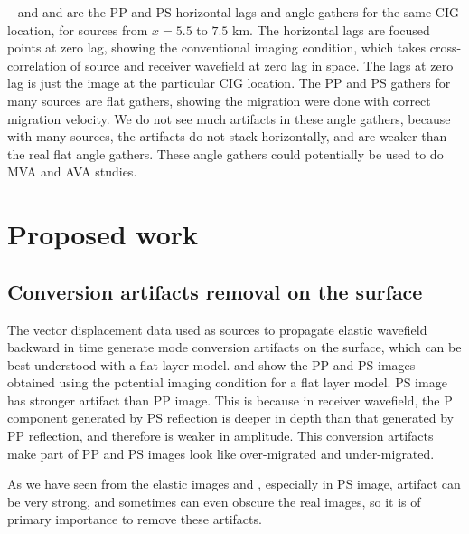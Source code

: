 -- and  and  are the PP and PS horizontal lags and angle gathers for the same CIG location, for sources from $x=5.5$ to $7.5$ km. 
The horizontal lags are focused points at zero lag, showing the conventional imaging condition, which takes cross-correlation of source and receiver wavefield at zero lag in space. The lags at zero lag is just the image at the particular CIG location. The PP and PS gathers for many sources are flat gathers, showing the migration were done with correct migration velocity. We do not see much artifacts in these angle gathers, because with many sources, the artifacts do not stack horizontally, and are weaker than the real flat angle gathers. These angle gathers could potentially be used to do MVA and AVA studies.


\section{Proposed work}

\subsection{Conversion artifacts removal on the surface}
The vector displacement data used as sources to propagate elastic wavefield backward in time generate mode conversion artifacts on the surface, which can be best understood with a flat layer model. 
 and  show the PP and PS images obtained using the potential imaging condition for a flat layer model. PS image has stronger artifact than PP image. This is because in receiver wavefield, the P component generated by PS reflection is deeper in depth than that generated by PP reflection, and therefore is weaker in amplitude.
This conversion artifacts make part of PP and PS images look like over-migrated and under-migrated. 

As we have seen from the elastic images  and , especially in PS image, artifact can be very strong, and sometimes can even obscure the real images, so it is of primary importance to remove these artifacts.

